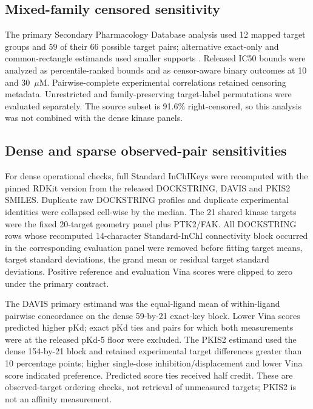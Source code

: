 \documentclass[11pt]{article}
\begin{document}
\subsection{Mixed-family censored sensitivity}

The primary Secondary Pharmacology Database analysis used 12 mapped target groups and 59
of their 66 possible target pairs; alternative exact-only and common-rectangle estimands
used smaller supports \cite{sutherland2023}. Released IC50 bounds were analyzed as percentile-ranked bounds and as
censor-aware binary outcomes at 10 and 30~$\mu$M. Pairwise-complete experimental
correlations retained censoring metadata. Unrestricted and family-preserving target-label
permutations were evaluated separately. The source subset is 91.6\% right-censored, so this
analysis was not combined with the dense kinase panels.

\subsection{Dense and sparse observed-pair sensitivities}

For dense operational checks, full Standard InChIKeys were recomputed with the pinned RDKit
version from the released DOCKSTRING, DAVIS and PKIS2 SMILES. Duplicate raw DOCKSTRING
profiles and duplicate experimental identities were collapsed cell-wise by the median. The
21 shared kinase targets were the fixed 20-target geometry panel plus PTK2/FAK. All
DOCKSTRING rows whose recomputed 14-character Standard-InChI connectivity block occurred in
the corresponding evaluation panel were removed before fitting target means, target standard
deviations, the grand mean or residual target standard deviations. Positive reference and
evaluation Vina scores were clipped to zero under the primary contract.

The DAVIS primary estimand was the equal-ligand mean of within-ligand pairwise concordance on
the dense 59-by-21 exact-key block. Lower Vina scores predicted higher pKd; exact pKd ties and
pairs for which both measurements were at the released pKd-5 floor were excluded. The PKIS2
estimand used the dense 154-by-21 block and retained experimental target differences greater
than 10 percentage points; higher single-dose inhibition/displacement and lower Vina score
indicated preference. Predicted score ties received half credit. These are observed-target
ordering checks, not retrieval of unmeasured targets; PKIS2 is not an affinity measurement.
\end{document}
